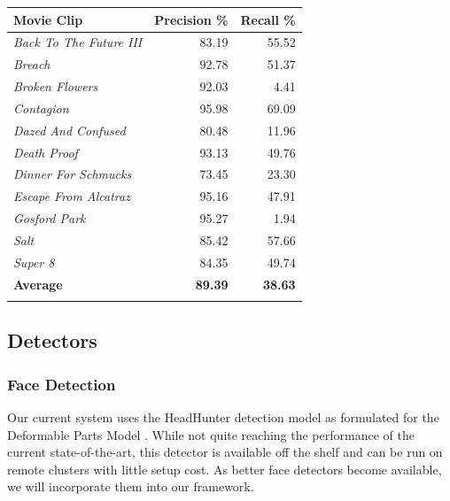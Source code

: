 \begin{center}
  \begin{tabular}{ l | r r }
    Movie Clip & Precision \% & Recall \% \\
    \hline
    \textit{ Back To The Future III } &  83.19 &  55.52\\
    \textit{ Breach } &  92.78 &  51.37\\
    \textit{ Broken Flowers } &  92.03 &  4.41\\
    \textit{ Contagion } &  95.98 &  69.09\\
    \textit{ Dazed And Confused } &  80.48 &  11.96\\
    \textit{ Death Proof } &  93.13 &  49.76\\
    \textit{ Dinner For Schmucks } &  73.45 &  23.30\\
    \textit{ Escape From Alcatraz } &  95.16 &  47.91\\
    \textit{ Gosford Park } &  95.27 &  1.94\\
    \textit{ Salt } &  85.42 &  57.66\\
    \textit{ Super 8 } &  84.35 &  49.74\\
    \textbf{ Average } &  \textbf{89.39} &  \textbf{38.63}\\
    \label{tab:shotdetResults}
  \end{tabular}
\end{center}
    

\subsection{Detectors}
\subsubsection{Face Detection}
Our current system uses the HeadHunter \cite{mathias_face_2014} detection model as formulated for the Deformable Parts Model \cite{lsvm-pami}. While not quite reaching the performance of the current state-of-the-art, this detector is available off the shelf and can be run on remote clusters with little setup cost. As better face detectors become available, we will incorporate them into our framework.

